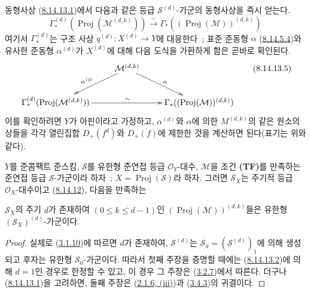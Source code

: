 \begin{remark}[8.14.13]
동형사상 (\hyperref[II.8.14.13.1-ko]{8.14.13.1})에서 다음과 같은 등급
$\mathcal{S}^{(d)}$-가군의 동형사상을 즉시 얻는다.
\begin{equation}
\label{II.8.14.13.4-ko}
  \Gamma_*^{(d)}(\operatorname{Proj}(\mathcal{M}^{(d,k)}))
  \xrightarrow{\sim}
  \Gamma_*((\operatorname{Proj}(\mathcal{M}))^{(d,k)})
\tag{8.14.13.4}
\end{equation}
여기서 $\Gamma_*^{(d)}$는 구조 사상 $q^{(d)}:X^{(d)}\to Y$에
대응한다~; 표준 준동형 $\alpha$
(\hyperref[II.8.14.5.4-ko]{8.14.5.4})와 유사한 준동형
$\alpha^{(d)}$가 $X^{(d)}$에 대해 다음 도식을 가환하게 함은 곧바로
확인된다.
\begin{equation}
\label{II.8.14.13.5-ko}
  \xymatrix{
    & \mathcal{M}^{(d,k)}\ar[dl]_{\alpha^{(d)}}\ar[dr]^{\alpha} & \\
    \Gamma_*^{(d)}(\operatorname{Proj}(\mathcal{M}^{(d,k)}))
      \ar[rr]^{\sim}
      && \Gamma_*((\operatorname{Proj}(\mathcal{M}))^{(d,k)})
  }
\tag{8.14.13.5}
\end{equation}
이를 확인하려면 $Y$가 아핀이라고 가정하고, $\alpha^{(d)}$와
$\alpha$에 의한 $M^{(d,k)}$의 같은 원소의 상들을 각각 열린집합
$D_+(f^d)$와 $D_+(f)$에 제한한 것을 계산하면 된다(표기는 위와 같다).
\end{remark}

\begin{proposition}[8.14.14]
\label{II.8.14.14-ko}
$Y$를 준콤팩트 준스킴, $\mathcal{S}$를 유한형 준연접 등급
$\mathcal{O}_Y$-대수, $\mathcal{M}$을 조건
\textbf{(TF)}를 만족하는 준연접 등급 $\mathcal{S}$-가군이라 하자~;
$X=\operatorname{Proj}(\mathcal{S})$라 하자. 그러면
$\mathcal{S}_X$는 주기적 등급 $\mathcal{O}_X$-대수이고
(\hyperref[II.8.14.12-ko]{8.14.12}), 다음을 만족하는

$\mathcal{S}_X$의 주기 $d$가 존재하여 $(0\leqslant k\leqslant d-1)$인
$(\operatorname{Proj}(\mathcal{M}))^{(d,k)}$들은
유한형 $(\mathcal{S}_X)^{(d)}$-가군이다.
\end{proposition}

\begin{proof}
실제로 (\hyperref[II.3.1.10-ko]{3.1.10})에 따르면 $d$가 존재하여,
$\mathcal{S}^{(d)}$는 $\mathcal{S}_d=(\mathcal{S}^{(d)})_1$에 의해
생성되고 후자는 유한형 $\mathcal{S}_0$-가군이다. 따라서 첫째 주장을
증명할 때에는
(\hyperref[II.8.14.13.2-ko]{8.14.13.2})에 의해 $d=1$인 경우로
한정할 수 있고, 이 경우 그 주장은
(\hyperref[II.3.2.7-ko]{3.2.7})에서 따른다. 더구나
(\hyperref[II.8.14.13.1-ko]{8.14.13.1})을 고려하면, 둘째 주장은
(\hyperref[II.2.1.6-ko]{2.1.6, (iii)})과
(\hyperref[II.3.4.3-ko]{3.4.3})의 귀결이다.
\end{proof}
